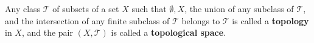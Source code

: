 Any class $\mathcal{T}$ of subsets of a set $X$ such that $\emptyset, X$, the union of any subclass of $\mathcal{T}$, and the intersection of any finite subclass of $\mathcal{T}$ belongs to $\mathcal{T}$ is called a \textbf{topology} in $X$, and the pair $(X, \mathcal{T})$ is called a \textbf{topological space}.
